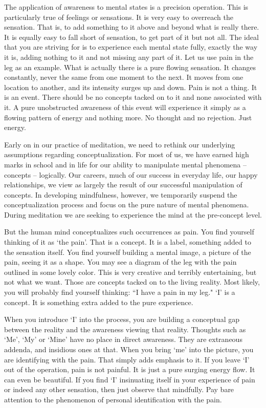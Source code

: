 The application of awareness to mental states is a precision operation. This is
particularly true of feelings or sensations. It is very easy to overreach the
sensation. That is, to add something to it above and beyond what is really
there. It is equally easy to fall short of sensation, to get part of it but not
all. The ideal that you are striving for is to experience each mental state
fully, exactly the way it is, adding nothing to it and not missing any part of
it. Let us use pain in the leg as an example. What is actually there is a pure
flowing sensation. It changes constantly, never the same from one moment to the
next. It moves from one location to another, and its intensity surges up and
down. Pain is not a thing. It is an event. There should be no concepts tacked on
to it and none associated with it. A pure unobstructed awareness of this event
will experience it simply as a flowing pattern of energy and nothing more. No
thought and no rejection. Just energy.

Early on in our practice of meditation, we need to rethink our underlying
assumptions regarding conceptualization. For most of us, we have earned high
marks in school and in life for our ability to manipulate mental phenomena --
concepts -- logically. Our careers, much of our success in everyday life, our
happy relationships, we view as largely the result of our successful
manipulation of concepts. In developing mindfulness, however, we temporarily
suspend the conceptualization process and focus on the pure nature of mental
phenomena. During meditation we are seeking to experience the mind at the
pre-concept level.

But the human mind conceptualizes such occurrences as pain. You find yourself
thinking of it as `the pain'. That is a concept. It is a label, something added
to the sensation itself. You find yourself building a mental image, a picture of
the pain, seeing it as a shape. You may see a diagram of the leg with the pain
outlined in some lovely color. This is very creative and terribly entertaining,
but not what we want. Those are concepts tacked on to the living reality. Most
likely, you will probably find yourself thinking: ``I have a pain in my leg." `I'
is a concept. It is something extra added to the pure experience.

When you introduce `I' into the process, you are building a conceptual gap
between the reality and the awareness viewing that reality. Thoughts such as
`Me', `My' or `Mine' have no place in direct awareness. They are extraneous
addenda, and insidious ones at that. When you bring `me' into the picture, you
are identifying with the pain. That simply adds emphasis to it. If you leave `I'
out of the operation, pain is not painful. It is just a pure surging energy
flow. It can even be beautiful. If you find `I' insinuating itself in your
experience of pain or indeed any other sensation, then just observe that
mindfully. Pay bare attention to the phenomenon of personal identification with
the pain.

